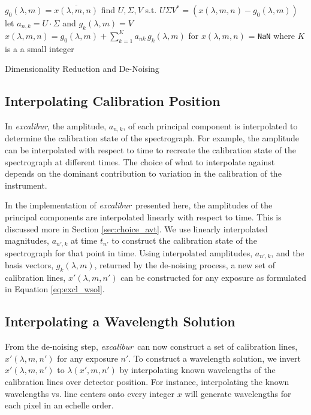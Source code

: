 \documentclass[twocolumn,table,xcolor,trackchanges]{aastex63}
\newcommand{\project}[1]{\textsl{#1}}
\newcommand{\name}{\project{excalibur}}
\newcommand{\code}[1]{\texttt{#1}}
\begin{document}
\begin{algorithm}
\SetAlgoLined
{}
{
	$g_0(\lambda,m) = \overline{x(\lambda,m,n)}$\;
	 find $U, \Sigma, V$ s.t. $U\Sigma V^* = (x(\lambda,m,n)-g_0(\lambda,m))$\;
	let $a_{n,k} = U\cdot \Sigma$ and $g_k(\lambda,m) = V$\;
	$x(\lambda,m,n) = g_0(\lambda,m) + \sum_{k=1}^K a_{nk}\,g_k(\lambda,m)$ for $x(\lambda,m,n)$ = \code{NaN} where $K$ is a a small integer
	}
\caption{Dimensionality Reduction and De-Noising}
\end{algorithm}

\subsection{Interpolating Calibration Position}
 \label{sec:interp_time}
In \name, the amplitude, $a_{n,k}$, of each principal component is interpolated to determine the calibration state of the spectrograph.  For example, the amplitude can be interpolated with respect to time to recreate the calibration state of the spectrograph at different times.  The choice of what to interpolate against depends on the dominant contribution to variation in the calibration of the instrument.

In the implementation of \name\ presented here, the amplitudes of the principal components are interpolated linearly with respect to time.  This is discussed more in Section \ref{sec:choice_avt}.    We use linearly interpolated magnitudes, $a_{n',k}$ at time $t_{n'}$ to construct the calibration state of the spectrograph for that point in time.  Using interpolated amplitudes, $a_{n',k}$, and the basis vectors, $g_k(\lambda,m)$, returned by the de-noising process, a new set of calibration lines, $x'(\lambda,m,n')$ can be constructed for any exposure as formulated in Equation \ref{eq:excl_wsol}.


\subsection{Interpolating a Wavelength Solution} \label{sec:interp_wsol}
From the de-noising step, \name\ can now construct a set of calibration lines, $x'(\lambda,m,n')$ for any exposure $n'$.  To construct a wavelength solution, we invert $x'(\lambda,m,n')$ to $\lambda(x',m,n')$ by interpolating known wavelengths of the calibration lines over detector position.  For instance, interpolating the known wavelengths vs. line centers onto every integer $x$ will generate wavelengths for each pixel in an echelle order.
\end{document}
